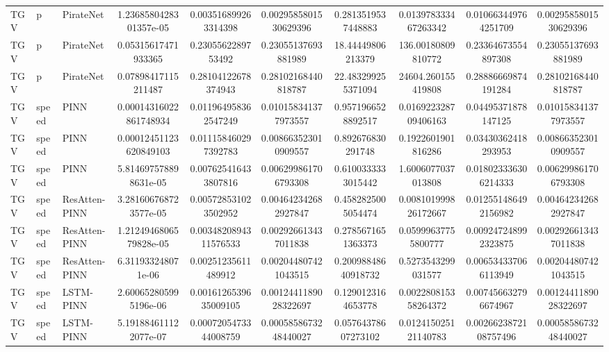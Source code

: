 \begin{landscape}
\begin{longtable}{lllccccccc}
 TGV &     p &      PirateNet & 1.2368580428301357e-05 &   0.003516899263314398 &  0.0029585801530629396 &   0.2813519537448883 &  0.013978333467263342 &  0.010663449764251709 &  0.0029585801530629396 \\
 TGV &     p &      PirateNet &    0.05315617471933365 &     0.2305562289753492 &    0.23055137693881989 &    18.44449806213379 &    136.00180809810772 &   0.23364673554897308 &    0.23055137693881989 \\
 TGV &     p &      PirateNet &    0.07898417115211487 &    0.28104122678374943 &    0.28102168440818787 &   22.483299255371094 &    24604.260155419808 &   0.28886669874191284 &    0.28102168440818787 \\
 TGV & speed &           PINN & 0.00014316022861748934 &   0.011964958362547249 &   0.010158341377973557 &   0.9571966528892517 &  0.016922328709406163 &   0.04495371878147125 &   0.010158341377973557 \\
 TGV & speed &           PINN & 0.00012451123620849103 &   0.011158460297392783 &   0.008663523010909557 &    0.892676830291748 &    0.1922601901816286 &   0.03430362418293953 &   0.008663523010909557 \\
 TGV & speed &           PINN &  5.814697578898631e-05 &   0.007625416433807816 &   0.006299861706793308 &   0.6100333333015442 &    1.6006077037013808 &  0.018023336306214333 &   0.006299861706793308 \\
 TGV & speed &  ResAtten-PINN &  3.281606768723577e-05 &   0.005728531023502952 &   0.004642342682927847 &   0.4582825005054474 &  0.008101999826172667 &  0.012551486492156982 &   0.004642342682927847 \\
 TGV & speed &  ResAtten-PINN & 1.2124946806579828e-05 &  0.0034820894311576533 &   0.002926613437011838 &   0.2785671651363373 &   0.05999637755800777 &  0.009247248992323875 &   0.002926613437011838 \\
 TGV & speed &  ResAtten-PINN &     6.311933248071e-06 &    0.00251235611489912 &   0.002044807421043515 &  0.20098848640918732 &    0.5273543299031577 &  0.006534337066113949 &   0.002044807421043515 \\
 TGV & speed &      LSTM-PINN &  2.600652805995196e-06 &  0.0016126539635009105 &  0.0012441189028322697 &   0.1290123164653778 &  0.002280815358264372 &  0.007456632796674967 &  0.0012441189028322697 \\
 TGV & speed &      LSTM-PINN &  5.191884611122077e-07 &  0.0007205473344008759 &  0.0005858673248440027 &  0.05764378607273102 &  0.012415025121140783 & 0.0026623872108757496 &  0.0005858673248440027 \\

\end{longtable}
\end{landscape}
